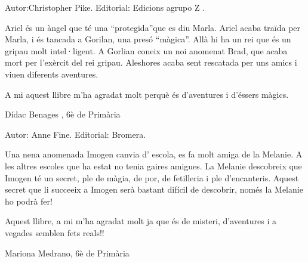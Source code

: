 \begin{shortnews}
{
Autor:Christopher Pike. Editorial: Edicions  agrupo  Z .

Ariel és un àngel que té una “protegida”que es diu Marla. Ariel acaba traïda per Marla, i és tancada a Gorilan, una presó “màgica”. Allà hi ha un rei que és un gripau molt intel·ligent. A Gorlian coneix un noi anomenat Brad, que acaba mort per l’exèrcit del rei gripau. Aleshores acaba sent rescatada per uns amics i viuen diferents aventures.

A mi aquest llibre m’ha agradat molt perquè és d’aventures i d’éssers màgics.

Dídac Benages , 6è de Primària
}

{
Autor: Anne Fine. Editorial: Bromera.

Una nena anomenada Imogen canvia d’ escola, es fa  molt amiga de la Melanie. A les altres escoles que ha estat no tenia gaires amigues. La Melanie descobreix que Imogen té un secret, ple de màgia, de por, de fetilleria i ple d’encanteris. Aquest secret que li succeeix a Imogen serà bastant difícil de descobrir, només la Melanie ho podrà fer!

Aquest llibre, a mi m’ha agradat molt ja que és de misteri, d’aventures i a vegades semblen fets reals!!

Mariona Medrano, 6è de Primària
}

\end{shortnews}
